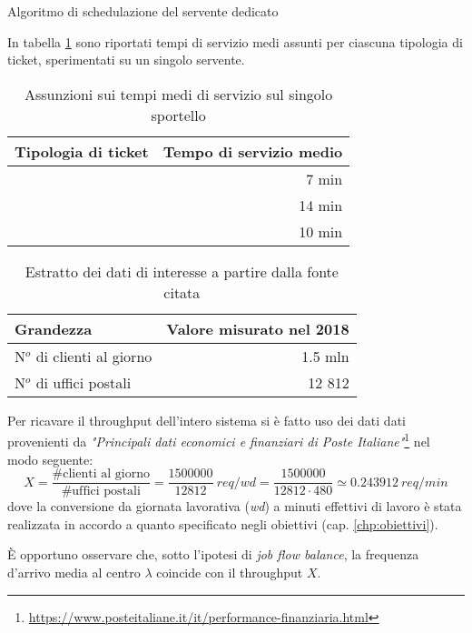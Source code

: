 \begin{algorithm}
\SetAlgoLined
{}
\caption{Algoritmo di schedulazione del servente dedicato}
\label{alg:modello-specifiche-2}
\end{algorithm}

\newpage
In tabella \ref{table:modello-specifiche-1} sono riportati tempi di servizio medi assunti per ciascuna tipologia di ticket, sperimentati su un singolo servente.
\begin{table}[ht]
\centering
{\tablecolors
\begin{tabular}{| l | r |}
\hline
Tipologia di ticket & Tempo di servizio medio \\
\hline
\uo{} & 7 min \\
\hline
\pp{} & 14 min \\
\hline
\sr{} & 10 min \\
\hline
\end{tabular}}
\caption{Assunzioni sui tempi medi di servizio sul singolo sportello}
\label{table:modello-specifiche-1}
\end{table}	

\begin{table}[ht]
\centering
{\tablecolors
\begin{tabular}{| l | r |}
\hline
Grandezza & Valore misurato nel 2018 \\
\hline
N$^o$ di clienti al giorno & 1.5 mln \\
\hline
N$^o$ di uffici postali & 12 812 \\
\hline
\end{tabular}}
\caption{Estratto dei dati di interesse a partire dalla fonte citata}
\label{table:modello-specifiche-2}
\end{table}

Per ricavare il throughput dell'intero sistema si è fatto uso dei dati dati provenienti da \textsl{"Principali dati economici e finanziari di Poste Italiane"}\footnote{\url{https://www.posteitaliane.it/it/performance-finanziaria.html}} nel modo seguente:
\begin{equation}
X = \frac{\# \text{clienti al giorno}}{\#\text{uffici postali}} = \frac{1500000}{12812}\ req/wd = \frac{1500000}{12812\cdot 480} \simeq 0.243912\ req/min
\end{equation} 
dove la conversione da giornata lavorativa (\textsl{wd}) a minuti effettivi di lavoro è stata realizzata in accordo a quanto specificato negli obiettivi (cap. \ref{chp:obiettivi}).

È opportuno osservare che, sotto l'ipotesi di \textsl{job flow balance}, la frequenza d'arrivo media al centro $\lambda$ coincide con il throughput $X$.

